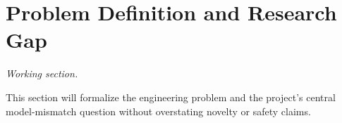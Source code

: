 \section{Problem Definition and Research Gap}
\label{sec:problem}

\textit{Working section.}

This section will formalize the engineering problem and the project's central
model-mismatch question without overstating novelty or safety claims.
